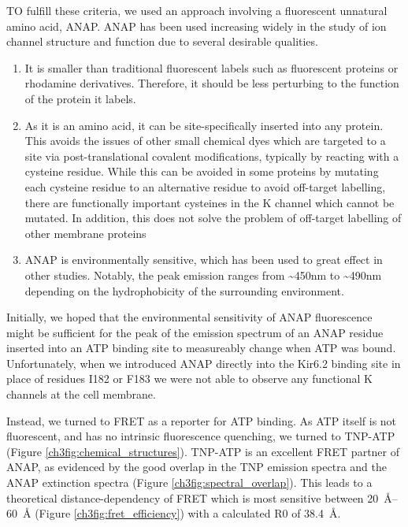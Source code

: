 TO fulfill these criteria, we used an approach involving a fluorescent unnatural amino acid, ANAP.
ANAP has been used increasing widely in the study of ion channel structure and function due to several desirable qualities.

\begin{enumerate}
	\item It is smaller than traditional fluorescent labels such as fluorescent proteins or rhodamine derivatives.
	Therefore, it should be less perturbing to the function of the protein it labels.
	\item As it is an amino acid, it can be site-specifically inserted into any protein.
	This avoids the issues of other small chemical dyes which are targeted to a site via post-translational covalent modifications, typically by reacting with a cysteine residue.
	While this can be avoided in some proteins by mutating each cysteine residue to an alternative residue to avoid off-target labelling, there are functionally important cysteines in the K\ATP{} channel which cannot be mutated.
	In addition, this does not solve the problem of off-target labelling of other membrane proteins
	\item ANAP is environmentally sensitive, which has been used to great effect in other studies.
	Notably, the peak emission ranges from \textasciitilde450nm to \textasciitilde490nm depending on the hydrophobicity of the surrounding environment.
\end{enumerate}

Initially, we hoped that the environmental sensitivity of ANAP fluorescence might be sufficient for the peak of the emission spectrum of an ANAP residue inserted into an ATP binding site to measureably change when ATP was bound.
Unfortunately, when we introduced ANAP directly into the Kir6.2 binding site in place of residues I182 or F183 we were not able to observe any functional K\ATP{} channels at the cell membrane.

Instead, we turned to FRET as a reporter for ATP binding.
As ATP itself is not fluorescent, and has no intrinsic fluorescence quenching, we turned to TNP-ATP (Figure \ref{ch3fig:chemical_structures}).
TNP-ATP is an excellent FRET partner of ANAP, as evidenced by the good overlap in the TNP emission spectra and the ANAP extinction spectra (Figure \ref{ch3fig:spectral_overlap}).
This leads to a theoretical distance-dependency of FRET which is most sensitive between \SIrange{20}{60}{\angstrom} (Figure \ref{ch3fig:fret_efficiency}) with a calculated R0 of \SI{38.4}{\angstrom}.

